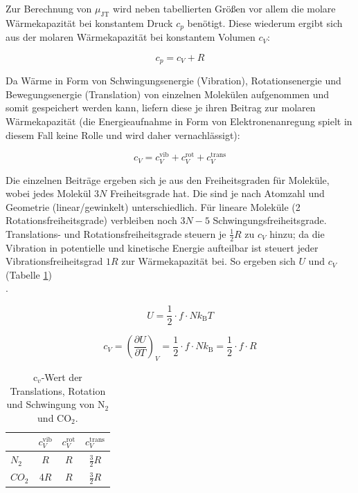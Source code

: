 \documentclass[a4paper,12pt,oneside,onecolum,final,openany]{report}
\begin{document}
Zur Berechnung von $\mu_\mathrm{JT}$ wird neben tabellierten Größen vor allem die molare Wärmekapazität bei konstantem Druck $c_p$ benötigt. Diese wiederum ergibt sich aus der molaren Wärmekapazität bei konstantem Volumen $c_V$:

\begin{equation}
c_p = c_V +R \label{cpauscv}
\end{equation}

Da Wärme in Form von Schwingungsenergie (Vibration), Rotationsenergie und Bewegungsenergie (Translation) von einzelnen Molekülen aufgenommen und somit gespeichert werden kann, liefern diese je ihren Beitrag zur molaren Wärmekapazität (die Energieaufnahme in Form von Elektronenanregung spielt in diesem Fall keine Rolle und wird daher vernachlässigt):

\begin{equation}
c_V = c_V^\mathrm{ vib} + c_V^\mathrm{ rot} + c_V^\mathrm{trans}  
\label{cv=rotvibtrans}
\end{equation}

Die einzelnen Beiträge ergeben sich je aus den Freiheitsgraden für Moleküle, wobei jedes Molekül $3N$ Freiheitsgrade hat. Die sind je nach Atomzahl und Geometrie (linear/gewinkelt) unterschiedlich. Für lineare Moleküle (2 Rotationsfreiheitsgrade) verbleiben noch $3N-5$ Schwingungsfreiheitsgrade. \\
Translations- und Rotationsfreiheitsgrade steuern je $\frac{1}{2} R$ zu $c_V$ hinzu; da die Vibration in potentielle und kinetische Energie aufteilbar ist steuert jeder Vibrationsfreiheitsgrad $1R$ zur Wärmekapazität bei. So ergeben sich $U$ und $c_V$ (Tabelle \ref{cvtabelle})\\.

 \begin{equation}
 U= \frac{1}{2} \cdot f \cdot Nk_\mathrm{B}T
 \end{equation}

\begin{equation}
c_V = \left(\frac{\partial U}{\partial T}\right)_V =\frac{1}{2} \cdot f \cdot N k_\mathrm{B} = \frac{1}{2}\cdot f\cdot R
\end{equation}



\begin{table} [h] \label{cvtabelle}
\centering
\caption{$\text{c}_v$-Wert der Translations, Rotation und Schwingung von $\text{N}_2$ und $\text{CO}_2$.}
\begin{tabular} {l | c|  c | c}
	 & $c_V^\mathrm{ vib}$  & $c_V^\mathrm{ rot}$ & $c_V^\mathrm{trans}$\\
	 \hline
	 $N_2$ & $R$ & $R$ &$\frac{3}{2}R$\\
	  $CO_2$ & 4$R$ & $R$ &$\frac{3}{2}R$\\
\end{tabular}
\end{table}
\end{document}
